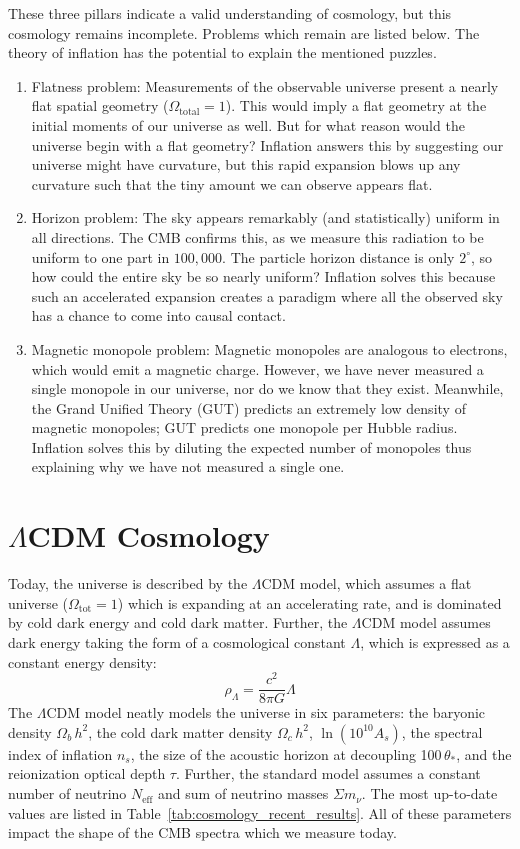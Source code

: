 These three pillars indicate a valid understanding of cosmology, but this cosmology remains incomplete.  Problems which remain are listed below.
The theory of inflation has the potential to explain the mentioned puzzles.

\begin{enumerate}
    \item Flatness problem:  Measurements of the observable universe present a nearly flat spatial geometry ($\Omega_{\text{total}}=1$).  This would imply a flat geometry at the initial moments of our universe as well.  But for what reason would the universe begin with a flat geometry?  Inflation answers this by suggesting our universe might have curvature, but this rapid expansion blows up any curvature such that the tiny amount we can observe appears flat. 
    \item Horizon problem:  The sky appears remarkably (and statistically) uniform in all directions.  The CMB confirms this, as we measure this radiation to be uniform to one part in $100,000$.  The particle horizon distance is only $2^{\circ}$, so how could the entire sky be so nearly uniform?  Inflation solves this because such an accelerated expansion creates a paradigm where all the observed sky has a chance to come into causal contact.
    \item Magnetic monopole problem:  Magnetic monopoles are analogous to electrons, which would emit a magnetic charge.  However, we have never measured a single monopole in our universe, nor do we know that they exist.  Meanwhile, the Grand Unified Theory (GUT) predicts an extremely low density of magnetic monopoles; GUT predicts one monopole per Hubble radius.  Inflation solves this by diluting the expected number of monopoles thus explaining why we have not measured a single one.
\end{enumerate}
\section{$\Lambda$CDM Cosmology}
Today, the universe is described by the $\Lambda$CDM model, which assumes a flat universe ($\Omega_{\text{tot}}=1$) which is expanding at an accelerating rate, and is dominated by cold dark energy and cold dark matter.  Further, the $\Lambda$CDM model assumes dark energy taking the form of a cosmological constant $\Lambda$, which is expressed as a constant energy density:
\begin{equation}
    \rho_\Lambda = \frac{c^2}{8\pi G}\Lambda 
\end{equation}
The $\Lambda$CDM model neatly models the universe in six parameters: the baryonic density $\Omega_b\,h^2$, the cold dark matter density $\Omega_c\,h^2$, $\ln(10^{10}A_s)$, the spectral index of inflation $n_s$, the size of the acoustic horizon at decoupling 100\,$\theta_{*}$, and the reionization optical depth $\tau$.  Further, the standard model assumes a constant number of neutrino $N_{\text{eff}}$ and sum of neutrino masses $\Sigma m_\nu$. The most up-to-date values are listed in Table~\ref{tab:cosmology_recent_results}.  All of these parameters impact the shape of the CMB spectra which we measure today.

